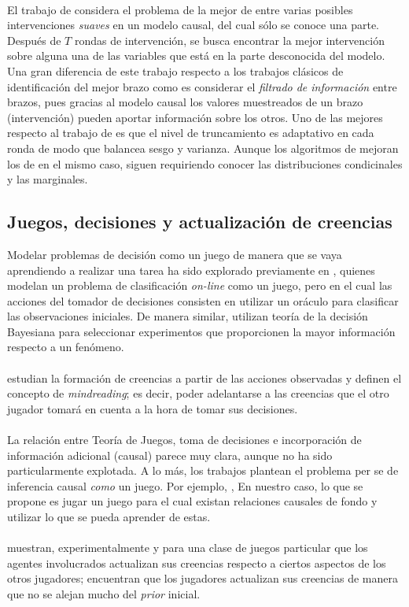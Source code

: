 \documentclass[11pt]{article}
\theoremstyle{plain}
\begin{document}
\\
\indent El trabajo de \cite{sen2017identifying} considera el problema de la mejor de entre varias posibles intervenciones \textit{suaves} en un modelo causal, del cual sólo se conoce una parte. Después de $T$ rondas de intervención, se busca encontrar la mejor intervención sobre alguna una de las variables que está en la parte desconocida del modelo. Una gran diferencia de este trabajo respecto a los trabajos clásicos de identificación del mejor brazo como \cite{audibert2010best} es considerar el \textit{filtrado de información} entre brazos, pues gracias al modelo causal los valores muestreados de un brazo (intervención) pueden aportar información sobre los otros. Uno de las mejores respecto al trabajo de \cite{lattimoreNIPS2016} es que el nivel de truncamiento es adaptativo en cada ronda de modo que balancea sesgo y varianza. Aunque los algoritmos de \cite{sen2017identifying} mejoran los de \cite{lattimoreNIPS2016} en el mismo caso, siguen requiriendo conocer las distribuciones condicinales y las marginales.
\subsection{Juegos, decisiones y actualización de creencias}
\indent Modelar problemas de decisión como un juego de manera que se vaya aprendiendo a realizar una tarea ha sido explorado previamente en \cite{werling2015job}, quienes modelan un problema de clasificación \textit{on-line} como un juego, pero en el cual las acciones del tomador de decisiones consisten en utilizar un oráculo para clasificar las observaciones iniciales. De manera similar, \cite{javdani2014near} utilizan teoría de la decisión Bayesiana para seleccionar experimentos que proporcionen la mayor información respecto a un fenómeno.\\
\\
\indent \cite{larrouy2017mindreading} estudian la formación de creencias a partir de las acciones observadas y definen el concepto de \textit{mindreading}; es decir, poder adelantarse a las creencias que el otro jugador tomará en cuenta a la hora de tomar sus decisiones.\\
\\
\indent La relación entre Teoría de Juegos, toma de decisiones e incorporación de información adicional (causal) parece muy clara, aunque no ha sido particularmente explotada. A lo más, los trabajos plantean el problema per se de inferencia causal \textit{como} un juego. Por ejemplo, \cite{heckerman1995decision}, \cite{eberhardt2008causal}  En nuestro caso, lo que se propone es jugar un juego para el cual existan relaciones causales de fondo y utilizar lo que se pueda aprender de estas.\\
\\
\cite{tingley2010belief} muestran, experimentalmente y para una clase de juegos particular que los agentes involucrados actualizan sus creencias respecto a ciertos aspectos de los otros jugadores; encuentran que los jugadores actualizan sus creencias de manera que no se alejan mucho del \textit{prior} inicial.\\
\end{document}
